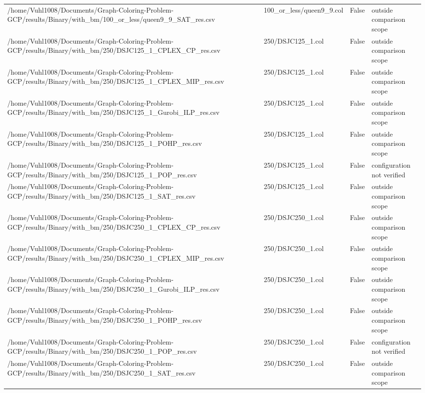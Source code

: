 \begin{table}[htbp]
\begin{tabular}{llll}
/home/Vuhl1008/Documents/Graph-Coloring-Problem-GCP/results/Binary/with\_bm/100\_or\_less/queen9\_9\_SAT\_res.csv & 100\_or\_less/queen9\_9.col & False & outside comparison scope \\
/home/Vuhl1008/Documents/Graph-Coloring-Problem-GCP/results/Binary/with\_bm/250/DSJC125\_1\_CPLEX\_CP\_res.csv & 250/DSJC125\_1.col & False & outside comparison scope \\
/home/Vuhl1008/Documents/Graph-Coloring-Problem-GCP/results/Binary/with\_bm/250/DSJC125\_1\_CPLEX\_MIP\_res.csv & 250/DSJC125\_1.col & False & outside comparison scope \\
/home/Vuhl1008/Documents/Graph-Coloring-Problem-GCP/results/Binary/with\_bm/250/DSJC125\_1\_Gurobi\_ILP\_res.csv & 250/DSJC125\_1.col & False & outside comparison scope \\
/home/Vuhl1008/Documents/Graph-Coloring-Problem-GCP/results/Binary/with\_bm/250/DSJC125\_1\_POHP\_res.csv & 250/DSJC125\_1.col & False & outside comparison scope \\
/home/Vuhl1008/Documents/Graph-Coloring-Problem-GCP/results/Binary/with\_bm/250/DSJC125\_1\_POP\_res.csv & 250/DSJC125\_1.col & False & configuration not verified \\
/home/Vuhl1008/Documents/Graph-Coloring-Problem-GCP/results/Binary/with\_bm/250/DSJC125\_1\_SAT\_res.csv & 250/DSJC125\_1.col & False & outside comparison scope \\
/home/Vuhl1008/Documents/Graph-Coloring-Problem-GCP/results/Binary/with\_bm/250/DSJC250\_1\_CPLEX\_CP\_res.csv & 250/DSJC250\_1.col & False & outside comparison scope \\
/home/Vuhl1008/Documents/Graph-Coloring-Problem-GCP/results/Binary/with\_bm/250/DSJC250\_1\_CPLEX\_MIP\_res.csv & 250/DSJC250\_1.col & False & outside comparison scope \\
/home/Vuhl1008/Documents/Graph-Coloring-Problem-GCP/results/Binary/with\_bm/250/DSJC250\_1\_Gurobi\_ILP\_res.csv & 250/DSJC250\_1.col & False & outside comparison scope \\
/home/Vuhl1008/Documents/Graph-Coloring-Problem-GCP/results/Binary/with\_bm/250/DSJC250\_1\_POHP\_res.csv & 250/DSJC250\_1.col & False & outside comparison scope \\
/home/Vuhl1008/Documents/Graph-Coloring-Problem-GCP/results/Binary/with\_bm/250/DSJC250\_1\_POP\_res.csv & 250/DSJC250\_1.col & False & configuration not verified \\
/home/Vuhl1008/Documents/Graph-Coloring-Problem-GCP/results/Binary/with\_bm/250/DSJC250\_1\_SAT\_res.csv & 250/DSJC250\_1.col & False & outside comparison scope \\

\end{tabular}
\end{table}
